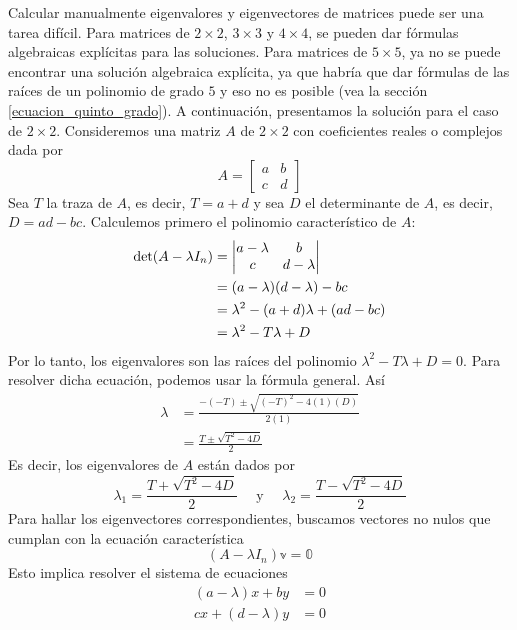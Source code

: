 Calcular manualmente eigenvalores y eigenvectores de matrices puede ser una tarea difícil. Para matrices de $2 \times 2$, $3 \times 3$ y $4 \times 4$, se pueden dar fórmulas algebraicas explícitas para las soluciones. Para matrices de $5 \times 5$, ya no se puede encontrar una solución algebraica explícita, ya que habría que dar fórmulas de las raíces de un polinomio de grado $5$ y eso no es posible (vea la sección \ref{ecuacion_quinto_grado}). A continuación, presentamos la solución para el caso de $2 \times 2$. Consideremos una matriz $A$ de $2 \times 2$ con coeficientes reales o complejos dada por
$$A = \begin{bmatrix}
    a & b \\
    c & d
\end{bmatrix}$$
Sea $T$ la traza de $A$, es decir, $T = a + d$ y sea $D$ el determinante de $A$, es decir, $D = ad - bc$. Calculemos primero el polinomio característico de $A$:
\begin{align*}
    \operatorname{det}(A - \lambda I_n) & = \begin{vmatrix} a - \lambda & b \\ c & d - \lambda \end{vmatrix} \\
    & = (a - \lambda)(d - \lambda) - bc \\
    & = \lambda^2 - (a + d)\lambda + (ad - bc) \\
    & = \lambda^2 - T\lambda + D
\end{align*}
Por lo tanto, los eigenvalores son las raíces del polinomio $\lambda^2 - T\lambda + D = 0$. Para resolver dicha ecuación, podemos usar la fórmula general. Así
\begin{align*}
    \lambda & = \frac{-(-T) \pm \sqrt{(-T)^2 - 4(1)(D)}}{2(1)} \\
    & = \frac{T \pm \sqrt{T^2 - 4D}}{2}
\end{align*}
Es decir, los eigenvalores de $A$ están dados por
$$\lambda_1 = \frac{T + \sqrt{T^2 - 4D}}{2} \quad \text{ y } \quad \lambda_2 = \frac{T - \sqrt{T^2 - 4D}}{2}$$
Para hallar los eigenvectores correspondientes, buscamos vectores no nulos que cumplan con la ecuación característica
$$(A - \lambda I_n)\mathbb{v} = \mathbb{0}$$
Esto implica resolver el sistema de ecuaciones
\begin{align*}
    (a - \lambda)x + by & = 0 \\
    cx + (d - \lambda)y & = 0
\end{align*}
